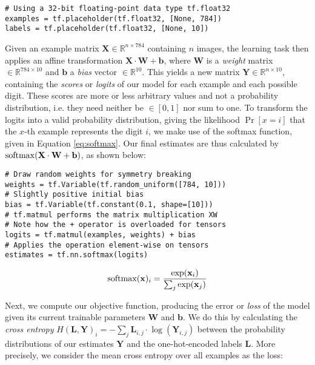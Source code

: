 \begin{lstlisting}
# Using a 32-bit floating-point data type tf.float32
examples = tf.placeholder(tf.float32, [None, 784])
labels = tf.placeholder(tf.float32, [None, 10])
\end{lstlisting}

Given an example matrix $\mathbf{X} \in \mathbb{R}^{n \times 784}$ containing
$n$ images, the learning task then applies an affine transformation
$\mathbf{X} \cdot \mathbf{W} + \mathbf{b}$, where $\mathbf{W}$ is a \emph{weight}
  matrix $\in \mathbb{R}^{784 \times 10}$ and $\mathbf{b}$ a \emph{bias} vector
$\in \mathbb{R}^{10}$. This yields a new matrix
$\mathbf{Y} \in \mathbb{R}^{n \times 10}$, containing the \emph{scores} or
\emph{logits} of our model for each example and each possible digit. These
scores are more or less arbitrary values and not a probability distribution,
i.e. they need neither be $\in [0, 1]$ nor sum to one. To transform the logits
into a valid probability distribution, giving the likelihood $\Pr[x = i]$ that
the $x$-th example represents the digit $i$, we make use of the softmax
function, given in Equation \ref{eq:softmax}. Our final estimates are thus
calculated by $\operatorname*{softmax}(\mathbf{X} \cdot \mathbf{W} + \mathbf{b})$, as shown
below:

\begin{lstlisting}
# Draw random weights for symmetry breaking
weights = tf.Variable(tf.random_uniform([784, 10]))
# Slightly positive initial bias
bias = tf.Variable(tf.constant(0.1, shape=[10]))
# tf.matmul performs the matrix multiplication XW
# Note how the + operator is overloaded for tensors
logits = tf.matmul(examples, weights) + bias
# Applies the operation element-wise on tensors
estimates = tf.nn.softmax(logits)
\end{lstlisting}

\begin{equation}\label{eq:softmax}
  \operatorname*{softmax}(\mathbf{x})_i = \frac{\exp(\mathbf{x}_i)}{\sum_j \exp(\mathbf{x}_j)}
\end{equation}

Next, we compute our objective function, producing the error or \emph{loss} of
the model given its current trainable parameters $\mathbf{W}$ and
$\mathbf{b}$. We do this by calculating the \emph{cross entropy}
$H(\mathbf{L}, \mathbf{Y})_i = -\sum_j \mathbf{L}_{i,j} \cdot
\log(\mathbf{Y}_{i,j})$ between the probability distributions of our estimates
$\mathbf{Y}$ and the one-hot-encoded labels $\mathbf{L}$. More precisely, we
consider the mean cross entropy over all examples as the loss:

